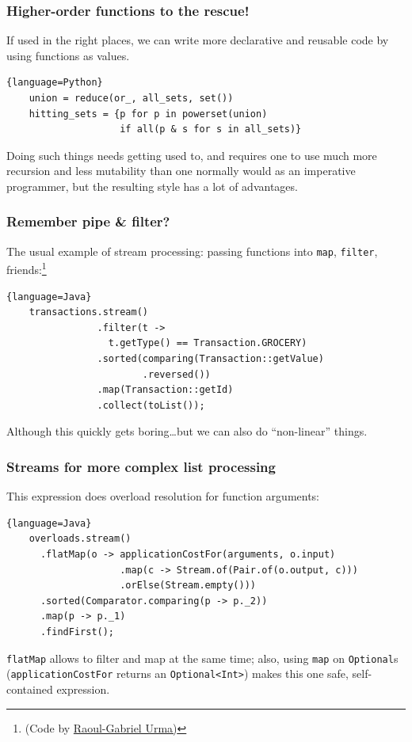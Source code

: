 \documentclass{beamer}
\begin{document}
\begin{frame}[containsverbatim]
  \frametitle{Higher-order functions to the rescue!} 

  If used in the right places, we can write more declarative and reusable code by using functions as
  values.

  \begin{lstlisting}{language=Python}
    union = reduce(or_, all_sets, set())
    hitting_sets = {p for p in powerset(union) 
                    if all(p & s for s in all_sets)}
  \end{lstlisting}

  Doing such things needs getting used to, and requires one to use much more recursion and less
  mutability than one normally would as an imperative programmer, but the resulting style has a lot
  of advantages.
\end{frame}


\begin{frame}[containsverbatim]
  \frametitle{Remember pipe \& filter?} 

  The usual example of stream processing: passing functions into \lstinline|map|,
  \lstinline|filter|, friends:\footnote{(Code by
    \href{http://www.oracle.com/technetwork/articles/java/ma14-java-se-8-streams-2177646.html}{%
      Raoul-Gabriel Urma)}}

  \begin{lstlisting}{language=Java}
    transactions.stream()
                .filter(t -> 
                  t.getType() == Transaction.GROCERY)
                .sorted(comparing(Transaction::getValue)
                        .reversed())
                .map(Transaction::getId)
                .collect(toList());
  \end{lstlisting}

  Although this quickly gets boring\ldots but we can also do \enquote{non-linear} things.
\end{frame}

\begin{frame}[containsverbatim]
  \frametitle{Streams for more complex list processing} 

  This expression does overload resolution for function arguments:

  \begin{lstlisting}{language=Java}
    overloads.stream()
      .flatMap(o -> applicationCostFor(arguments, o.input)
                    .map(c -> Stream.of(Pair.of(o.output, c)))
                    .orElse(Stream.empty()))
      .sorted(Comparator.comparing(p -> p._2))
      .map(p -> p._1)
      .findFirst();
  \end{lstlisting}

  \lstinline|flatMap| allows to filter and map at the same time; also, using \lstinline|map| on 
  \lstinline|Optional|s (\lstinline|applicationCostFor| returns an \lstinline|Optional<Int>|) makes
  this one safe, self-contained expression.
\end{frame}
\end{document}
